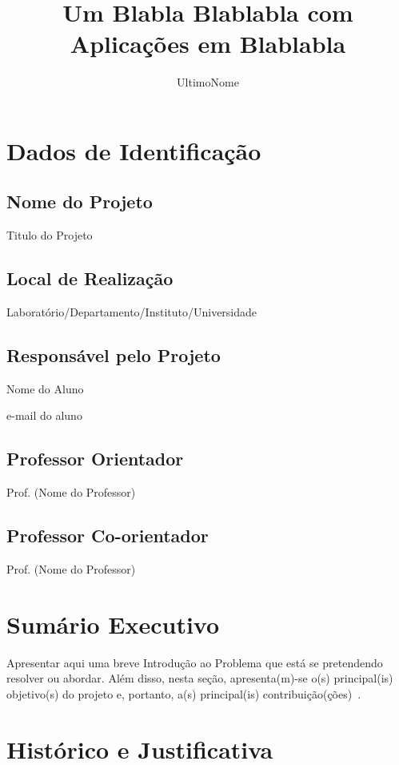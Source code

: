 \documentclass[tcc-proposta]{texufpel}
\title{Um Blabla Blablabla com Aplicações em Blablabla}
\author{UltimoNome}{Nome Sobrenome de}
\begin{document}

\maketitle 
\sloppy

\chapter{Dados de Identificação}

\section{Nome do Projeto}
Titulo do Projeto

\section{Local de Realização}
Laboratório/Departamento/Instituto/Universidade

\section{Responsável pelo Projeto}
Nome do Aluno

e-mail do aluno

\section{Professor Orientador}
Prof. (Nome do Professor)

\section{Professor Co-orientador}
Prof. (Nome do Professor)

\chapter{Sumário Executivo}

Apresentar aqui uma breve Introdução ao Problema que está se
pretendendo resolver ou abordar. Além disso, nesta seção,
apresenta(m)-se o(s) principal(is) objetivo(s) do projeto e, portanto,
a(s) principal(is) contribuição(ções)~\citet{Moore:1979:MAI,Aguiar:2005}.

\chapter{Histórico e Justificativa}
\end{document}
